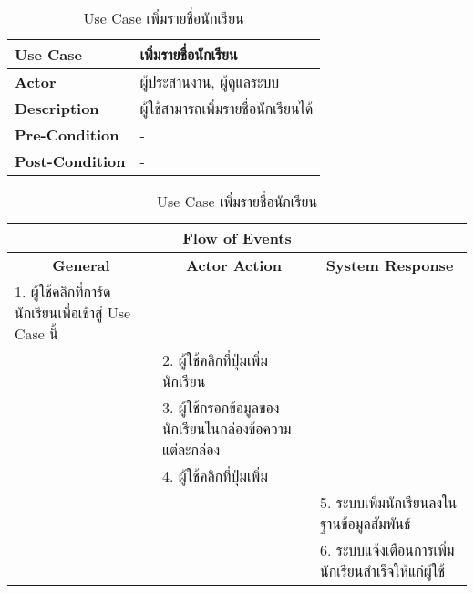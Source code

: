 \begin{table}[H]
    \caption{Use Case เพิ่มรายชื่อนักเรียน}
    \label{tab:usecase-create-student}
    \begin{tabularx}{\textwidth}{ | p{3cm} | X | }
    \hline
    \textbf{Use Case} & เพิ่มรายชื่อนักเรียน \\
    \hline
    \textbf{Actor} & ผู้ประสานงาน, ผู้ดูแลระบบ \\
    \hline
    \textbf{Description} & ผู้ใช้สามารถเพิ่มรายชื่อนักเรียนได้ \\
    \hline
    \textbf{Pre-Condition} & - \\
    \hline
    \textbf{Post-Condition} & - \\
    \hline
    \end{tabularx}
    \begin{tabularx}{\textwidth}{ | X | X | X | }
    \multicolumn{3}{|c|}{\textbf{Flow of Events}} \\
    \hline
    \multicolumn{1}{|c|}{\textbf{General}} & \multicolumn{1}{|c|}{\textbf{Actor Action}} & \multicolumn{1}{|c|}{\textbf{System Response}} \\
    \hline
    1. ผู้ใช้คลิกที่การ์ดนักเรียนเพื่อเข้าสู่ Use Case นี้ & & \\
    \hline
    & 2. ผู้ใช้คลิกที่ปุ่มเพิ่มนักเรียน & \\
    \hline
    & 3. ผู้ใช้กรอกข้อมูลของนักเรียนในกล่องข้อความแต่ละกล่อง & \\
    \hline
    & 4. ผู้ใช้คลิกที่ปุ่มเพิ่ม & \\
    \hline
    & & 5. ระบบเพิ่มนักเรียนลงในฐานข้อมูลสัมพันธ์ \\
    \hline
    & & 6. ระบบแจ้งเตือนการเพิ่มนักเรียนสำเร็จให้แก่ผู้ใช้ \\
    \hline
    \end{tabularx}
\end{table}
